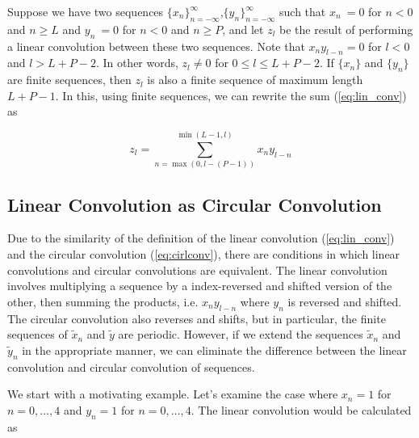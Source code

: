 \documentclass[12pt]{CSUNthesis}
\begin{document}
Suppose we have two sequences $\{x_n\}_{n=-\infty}^{\infty}$,$\{y_n\}_{n=-\infty}^{\infty} $ 
such that $ x_n \ = 0$ for $n<0$ and $n\geq L$ and $ y_n \ = 0$ for $n<0$ and $n \geq P$, and let $z_l$ be the result of performing a linear convolution between these two sequences. Note that $x_n y_{l-n}=0$ for $l < 0$ and $l > L + P - 2$. In other words, $z_l \not = 0$ for $0 \leq l \leq L + P - 2$. If $\{x_n\}$ and $\{y_n\}$ are finite sequences, then $z_l$ is also a finite sequence of maximum length $L+P-1$. In this, using finite sequences, we can rewrite the sum (\ref{eq:lin_conv}) as 

\begin{equation}
\label{eq:finite_lin_conv}
z_l = \sum_{n=\max(0,l-(P-1))}^{\min(L-1,l)} x_n y_{l-n}
\end{equation}

\subsection{Linear Convolution as Circular Convolution}
\label{sec:lin_circ_eq}
	Due to the similarity of the definition of the linear convolution (\ref{eq:lin_conv}) and the circular convolution (\ref{eq:cirlconv}), there are conditions in which linear convolutions and circular convolutions are equivalent. The linear convolution involves multiplying a sequence by a index-reversed and shifted version of the other, then summing the products, i.e. $x_n y_{l-n}$ where $y_n$ is reversed and shifted. The circular convolution also reverses and shifts, but in particular, the finite sequences of $\tilde{x}_n$ and $\tilde{y}$ are periodic. However, if we extend the sequences $\tilde{x}_n$ and $\tilde{y}_n$ in the appropriate manner, we can eliminate the difference between the linear convolution and circular convolution of sequences. 
	

	We start with a motivating example. Let's examine the case where $x_n=1$ for $n=0,\dots,4$ and $y_n=1$ for $n=0,\dots,4$. The linear convolution would be calculated as
	
\end{document}
